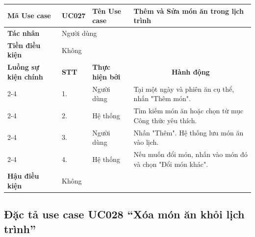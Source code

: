 \documentclass[../main.tex]{subfiles}
\begin{document}
\begin{longtable}{|p{2.7cm}|p{0.8cm}|p{2.6cm}|p{7.3cm}|}
\hline
\cellcolor[HTML]{D5F5E3}\textbf{Mã Use case} & \multicolumn{1}{l|}{UC027} & \cellcolor[HTML]{D5F5E3}\textbf{Tên Use case} & Thêm và Sửa món ăn trong lịch trình \\ \hline
\cellcolor[HTML]{D5F5E3}\textbf{Tác nhân} & \multicolumn{3}{p{10.7cm}|}{Người dùng} \\ \hline
\cellcolor[HTML]{D5F5E3}\textbf{Tiền điều kiện} & \multicolumn{3}{p{10.7cm}|}{Không} \\ \hline

\cellcolor[HTML]{D5F5E3}\textbf{Luồng sự kiện chính} & \cellcolor[HTML]{FDEBD0}\textbf{STT} & \cellcolor[HTML]{FDEBD0}\textbf{Thực hiện bởi} & \multicolumn{1}{c|}{\cellcolor[HTML]{FDEBD0}\textbf{Hành động}} \\ \cline{2-4} 
\cellcolor[HTML]{D5F5E3} & 1. & Người dùng & Tại một ngày và phiên ăn cụ thể, nhấn "Thêm món". \\ \cline{2-4} 
\cellcolor[HTML]{D5F5E3} & 2. & Hệ thống & Tìm kiếm món ăn hoặc chọn từ mục Công thức yêu thích. \\ \cline{2-4} 
\cellcolor[HTML]{D5F5E3} & 3. & Người dùng & Nhấn "Thêm". Hệ thống lưu món ăn vào lịch. \\ \cline{2-4} 
\cellcolor[HTML]{D5F5E3} & 4. & Hệ thống & Nếu muốn đổi món, nhấn vào món đó và chọn "Đổi món khác". \\ \hline

\cellcolor[HTML]{D5F5E3}\textbf{Hậu điều kiện} & \multicolumn{3}{p{10.7cm}|}{Không} \\ \hline
\end{longtable}
\endgroup

\subsection{Đặc tả use case UC028 ``Xóa món ăn khỏi lịch trình''}
\vspace{0.5cm}

\begingroup
\renewcommand{\arraystretch}{1.5}
\end{document}
